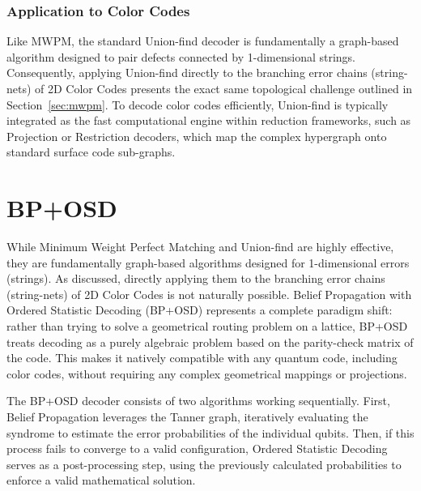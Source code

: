 \subsubsection*{Application to Color Codes}
 Like MWPM, the standard Union-find decoder is fundamentally a graph-based algorithm designed to pair defects connected by 1-dimensional strings. Consequently, applying Union-find directly to the branching error chains (string-nets) of 2D Color Codes presents the exact same topological challenge outlined in Section~\ref{sec:mwpm}. To decode color codes efficiently, Union-find is typically integrated as the fast computational engine within reduction frameworks, such as Projection or Restriction decoders, which map the complex hypergraph onto standard surface code sub-graphs.

\section{BP+OSD} 
\label{sec:bp_osd}

While Minimum Weight Perfect Matching and Union-find are highly effective, they are fundamentally graph-based algorithms designed for 1-dimensional errors (strings). As discussed, directly applying them to the branching error chains (string-nets) of 2D Color Codes is not naturally possible. Belief Propagation with Ordered Statistic Decoding (BP+OSD) represents a complete paradigm shift: rather than trying to solve a geometrical routing problem on a lattice, BP+OSD treats decoding as a purely algebraic problem based on the parity-check matrix of the code. This makes it natively compatible with any quantum code, including color codes, without requiring any complex geometrical mappings or projections.

The BP+OSD decoder consists of two algorithms working sequentially. First, Belief Propagation leverages the Tanner graph, iteratively evaluating the syndrome to estimate the error probabilities of the individual qubits. Then, if this process fails to converge to a valid configuration, Ordered Statistic Decoding serves as a post-processing step, using the previously calculated probabilities to enforce a valid mathematical solution.

